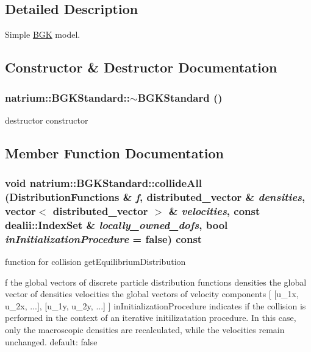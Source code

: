 \subsection{Detailed Description}
Simple \hyperlink{classnatrium_1_1BGK}{BGK} model. 

\subsection{Constructor \& Destructor Documentation}
\hypertarget{classnatrium_1_1BGKStandard_aa55035be79098a762cf4f0ef308d41e5}{
\subsubsection[{$\sim$BGKStandard}]{\setlength{\rightskip}{0pt plus 5cm}natrium::BGKStandard::$\sim$BGKStandard ()}}
\label{classnatrium_1_1BGKStandard_aa55035be79098a762cf4f0ef308d41e5}


destructor constructor 

\subsection{Member Function Documentation}
\hypertarget{classnatrium_1_1BGKStandard_a8e0493b063d56275d7ee607e25c4145e}{
\subsubsection[{collideAll}]{\setlength{\rightskip}{0pt plus 5cm}void natrium::BGKStandard::collideAll ({\bf DistributionFunctions} \& {\em f}, \/  {\bf distributed\_\-vector} \& {\em densities}, \/  vector$<$ {\bf distributed\_\-vector} $>$ \& {\em velocities}, \/  const dealii::IndexSet \& {\em locally\_\-owned\_\-dofs}, \/  bool {\em inInitializationProcedure} = {\ttfamily false}) const}}
\label{classnatrium_1_1BGKStandard_a8e0493b063d56275d7ee607e25c4145e}


function for collision getEquilibriumDistribution

f the global vectors of discrete particle distribution functions densities the global vector of densities velocities the global vectors of velocity components \mbox{[} \mbox{[}u\_\-1x, u\_\-2x, ...\mbox{]}, \mbox{[}u\_\-1y, u\_\-2y, ...\mbox{]} \mbox{]} inInitializationProcedure indicates if the collision is performed in the context of an iterative initilizatation procedure. In this case, only the macroscopic densities are recalculated, while the velocities remain unchanged. default: false 

